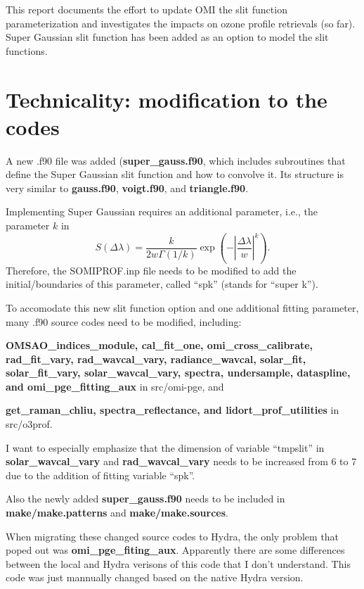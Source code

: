 \documentclass[hidelinks,12pt]{article}
\begin{document}
\maketitle
\abstract
This report documents the effort to update OMI the slit function parameterization and investigates the impacts on ozone profile retrievals (so far). Super Gaussian slit function has been added as an option to model the slit functions.

\section{Technicality: modification to the codes}

A new .f90 file was added (\textbf{super\_gauss.f90}, which includes subroutines that define the Super Gaussian slit function and how to convolve it. Its structure is very similar to \textbf{gauss.f90}, \textbf{voigt.f90}, and \textbf{triangle.f90}.

Implementing Super Gaussian requires an additional parameter, i.e., the parameter $k$ in 
\begin{equation*}
S(\Delta\lambda) = \frac{k}{2w\Gamma(1/k)}\exp \left(-\left|\frac{\Delta\lambda}{w}\right|^k \right).
\end{equation*}
Therefore, the SOMIPROF.inp file needs to be modified to add the initial/boundaries of this parameter, called ``spk'' (stands for ``super k''). 


To accomodate this new slit function option and one additional fitting parameter, many .f90 source codes need to be modified, including:

\textbf{OMSAO\_indices\_module, cal\_fit\_one, omi\_cross\_calibrate, rad\_fit\_vary, rad\_wavcal\_vary, radiance\_wavcal, solar\_fit, solar\_fit\_vary, solar\_wavcal\_vary, spectra, undersample, dataspline, and omi\_pge\_fitting\_aux} in src/omi-pge, and

\textbf{get\_raman\_chliu, spectra\_reflectance, and lidort\_prof\_utilities} in src/o3prof.

I want to especially emphasize that the dimension of variable ``tmpslit'' in \textbf{solar\_wavcal\_vary} and \textbf{rad\_wavcal\_vary} needs to be increased from 6 to 7 due to the addition of fitting variable ``spk''.

Also the newly added \textbf{super\_gauss.f90} needs to be included in \textbf{make/make.patterns} and \textbf{make/make.sources}.

When migrating these changed source codes to Hydra, the only problem that poped out was \textbf{omi\_pge\_fiting\_aux}. Apparently there are some differences between the local and Hydra verisons of this code that I don't understand. This code was just mannually changed based on the native Hydra version.
\end{document}
